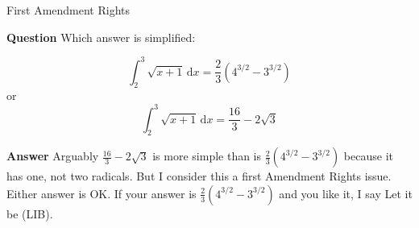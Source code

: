 \documentclass[fleqn]{beamer}
\theoremstyle{definition}
\begin{document}
\begin{frame}{First Amendment Rights}

\textbf{Question} Which answer is simplified:

\begin{equation*}
    \int_2^3 \sqrt{x+1} \, \mathrm{d}x =  \frac{2}{3} \left(4^{3/2} - 3^{3/2}\right)
\end{equation*}
or 
\begin{equation*}
    \int_2^3 \sqrt{x+1} \, \mathrm{d}x =  \frac{16}{3} - 2 \sqrt{3}
\end{equation*}

\textbf{Answer} Arguably $\frac{16}{3} - 2 \sqrt{3}$ is more simple 
than is $\frac{2}{3} \left(4^{3/2} - 3^{3/2}\right)$ because it 
has one, not two radicals. But I consider this a first Amendment 
Rights issue. Either answer is OK. If your answer is $\frac{2}{3} \left(4^{3/2} - 3^{3/2}\right)$
and you like it, I say Let it be (LIB).
\end{frame}
    
\end{document}
